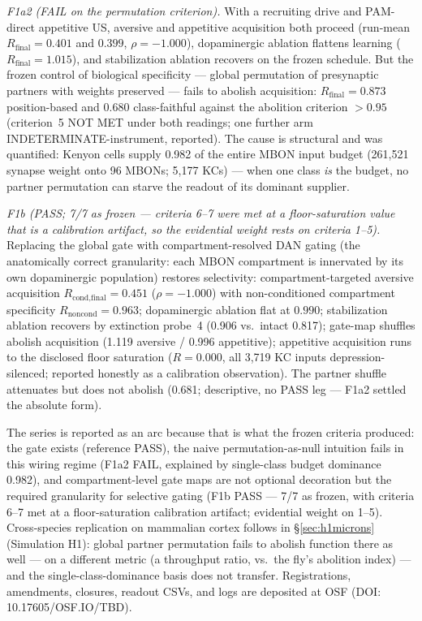 \documentclass[11pt,twocolumn]{article}
\theoremstyle{plain}
\begin{document}
\textit{F1a2 (FAIL on the permutation criterion).} With a recruiting drive
and PAM-direct appetitive US, aversive and appetitive acquisition both
proceed (run-mean $R_\text{final}=0.401$ and $0.399$,
$\rho=-1.000$), dopaminergic ablation flattens learning
($R_\text{final}=1.015$), and stabilization ablation recovers on the
frozen schedule. But the frozen control of biological specificity ---
global permutation of presynaptic partners with weights preserved ---
fails to abolish acquisition: $R_\text{final}=0.873$ position-based and
$0.680$ class-faithful against the abolition criterion $>0.95$
(criterion~5 NOT MET under both readings; one further arm
INDETERMINATE-instrument, reported). The cause is structural and was
quantified: Kenyon cells supply 0.982 of the entire MBON input budget
(261{,}521 synapse weight onto 96 MBONs; 5{,}177 KCs) --- when one class
\emph{is} the budget, no partner permutation can starve the readout of
its dominant supplier.

\textit{F1b (PASS; 7/7 as frozen --- criteria 6--7 were met at a floor-saturation value that is a calibration artifact, so the evidential weight rests on criteria 1--5).} Replacing the global gate with
compartment-resolved DAN gating (the anatomically correct granularity:
each MBON compartment is innervated by its own dopaminergic population)
restores selectivity: compartment-targeted aversive acquisition
$R_\text{cond,final}=0.451$ ($\rho=-1.000$) with non-conditioned
compartment specificity $R_\text{noncond}=0.963$; dopaminergic ablation
flat at $0.990$; stabilization ablation recovers by extinction probe~4
(0.906 vs.\ intact 0.817); gate-map shuffles abolish acquisition (1.119 aversive /
0.996 appetitive); appetitive acquisition runs to the disclosed floor
saturation ($R=0.000$, all 3{,}719 KC inputs depression-silenced; reported
honestly as a calibration observation). The partner shuffle attenuates
but does not abolish (0.681; descriptive, no PASS leg --- F1a2 settled
the absolute form).

The series is reported as an arc because that is what the frozen criteria
produced: the gate exists (reference PASS), the naive
permutation-as-null intuition fails in this wiring regime (F1a2 FAIL,
explained by single-class budget dominance 0.982), and compartment-level
gate maps are not optional decoration but the required granularity for
selective gating (F1b PASS --- 7/7 as frozen, with criteria 6--7 met at a
floor-saturation calibration artifact; evidential weight on 1--5).
Cross-species replication on mammalian cortex follows in
\S\ref{sec:h1microns} (Simulation H1): global partner permutation fails
to abolish function there as well --- on a different metric (a throughput
ratio, vs.\ the fly's abolition index) --- and the
single-class-dominance basis does not transfer.
Registrations, amendments, closures, readout CSVs, and logs are deposited
at OSF (DOI: 10.17605/OSF.IO/TBD).
\end{document}
